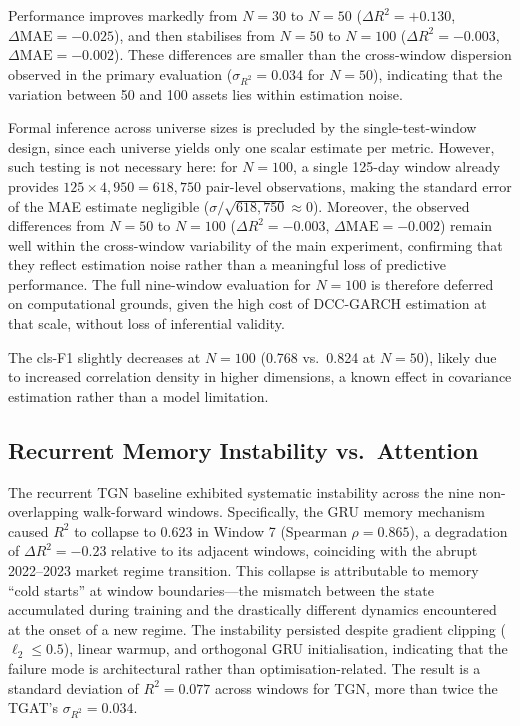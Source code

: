 \documentclass[runningheads]{llncs}
\begin{document}
Performance improves markedly from $N=30$ to $N=50$
($\Delta R^2 = +0.130$, $\Delta\text{MAE} = -0.025$), and then stabilises from $N=50$ to $N=100$ ($\Delta R^2 = -0.003$, $\Delta\text{MAE} = -0.002$). These differences are smaller than the cross-window dispersion observed in the primary evaluation ($\sigma_{R^2}=0.034$ for $N=50$), indicating that the variation between 50 and 100 assets lies within estimation noise.

Formal inference across universe sizes is precluded by the single-test-window design, since each universe yields only one scalar estimate per metric. However, such testing is not necessary here: for $N=100$, a single 125-day window already provides $125 \times 4{,}950 = 618{,}750$ pair-level observations, making the standard error of the MAE estimate negligible ($\sigma/\sqrt{618{,}750} \approx 0$). Moreover, the observed differences from $N=50$ to $N=100$ ($\Delta R^2 = -0.003$, $\Delta\text{MAE} = -0.002$) remain well within the cross-window variability of the main experiment, confirming that they reflect estimation noise rather than a meaningful loss of predictive performance. The full nine-window evaluation for $N=100$ is therefore deferred on computational grounds, given the high cost of DCC-GARCH estimation at that scale, without loss of inferential validity.

The cls-F1 slightly decreases at $N=100$ (0.768 vs.\ 0.824 at $N=50$), likely due to increased correlation density in higher dimensions, a known effect in covariance estimation rather than a model limitation.

\subsection{Recurrent Memory Instability vs.\ Attention}\label{training-stability}

The recurrent TGN baseline exhibited systematic instability across the nine non-overlapping walk-forward windows. Specifically, the GRU memory mechanism caused $R^2$ to collapse to $0.623$ in Window 7 (Spearman $\rho = 0.865$), a degradation of $\Delta R^2 = -0.23$ relative to its adjacent windows, coinciding with the abrupt 2022--2023 market regime transition. This collapse is attributable to memory ``cold starts'' at window boundaries---the mismatch between the state accumulated during training and the drastically different dynamics encountered at the onset of a new regime. The instability persisted despite gradient clipping ($\ell_2 \leq 0.5$), linear warmup, and orthogonal GRU initialisation, indicating that the failure mode is architectural rather than optimisation-related. The result is a standard deviation of $R^2 = 0.077$ across windows for TGN, more than twice the TGAT's $\sigma_{R^2} = 0.034$.
\end{document}
